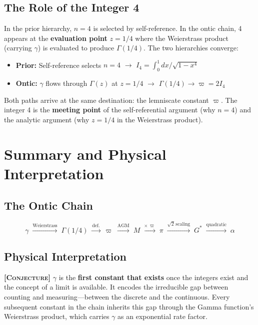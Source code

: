\documentclass[11pt, letterpaper]{article}
\newcommand{\G}{G^*}
\theoremstyle{definition}
\theoremstyle{remark}
\newcommand{\epi}[1]{\textbf{\textsc{[#1]}}}
\begin{document}
\subsection{The Role of the Integer 4}

In the prior hierarchy, $n = 4$ is selected by self-reference. In the ontic chain, 4 appears at the \textbf{evaluation point} $z = 1/4$ where the Weierstrass product (carrying $\gamma$) is evaluated to produce $\Gamma(1/4)$. The two hierarchies converge:

\begin{itemize}[noitemsep]
    \item \textbf{Prior:} Self-reference selects $n = 4$ $\to$ $I_4 = \int_0^1 dx/\sqrt{1-x^4}$
    \item \textbf{Ontic:} $\gamma$ flows through $\Gamma(z)$ at $z = 1/4$ $\to$ $\Gamma(1/4) \to \varpi = 2I_4$
\end{itemize}

Both paths arrive at the same destination: the lemniscate constant $\varpi$. The integer 4 is the \textbf{meeting point} of the self-referential argument (why $n = 4$) and the analytic argument (why $z = 1/4$ in the Weierstrass product).

\section{Summary and Physical Interpretation}

\subsection{The Ontic Chain}

\begin{equation}
    \boxed{\gamma \;\xrightarrow{\text{Weierstrass}}\; \Gamma(1/4) \;\xrightarrow{\text{def.}}\; \varpi \;\xrightarrow{\text{AGM}}\; M \;\xrightarrow{\times\,\varpi}\; \pi \;\xrightarrow{\sqrt{2}\,\text{scaling}}\; \G \;\xrightarrow{\text{quadratic}}\; \alpha}
\end{equation}

\subsection{Physical Interpretation}

\epi{Conjecture} $\gamma$ is the \textbf{first constant that exists} once the integers exist and the concept of a limit is available. It encodes the irreducible gap between counting and measuring---between the discrete and the continuous. Every subsequent constant in the chain inherits this gap through the Gamma function's Weierstrass product, which carries $\gamma$ as an exponential rate factor.
\end{document}
